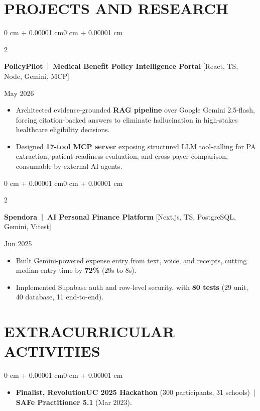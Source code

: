 \documentclass[10pt, letterpaper]{article}
\newenvironment{highlights}{
    \begin{itemize}[
        topsep=0.10 cm,
        parsep=0.06 cm,
        partopsep=0pt,
        itemsep=0.06 cm,
        leftmargin=12pt
    ]
}{
    \end{itemize}
}
\newenvironment{onecolentry}{
    \begin{adjustwidth}{0 cm + 0.00001 cm}{0 cm + 0.00001 cm}
}{
    \end{adjustwidth}
}
\newenvironment{twocolentry}[2][]{
    \onecolentry
    \def\secondColumn{#2}
    \setcolumnwidth{\fill, 4.5 cm}
    \begin{paracol}{2}
}{
    \switchcolumn \raggedleft \secondColumn
    \end{paracol}
    \endonecolentry
}
\begin{document}
\section{PROJECTS AND RESEARCH}
\begin{twocolentry}{May 2026}
\textbf{PolicyPilot \,|\, Medical Benefit Policy Intelligence Portal} [React, TS, Node, Gemini, MCP]
\end{twocolentry}
\begin{highlights}
  \item Architected evidence-grounded \textbf{RAG pipeline} over Google Gemini 2.5-flash, forcing citation-backed answers to eliminate hallucination in high-stakes healthcare eligibility decisions.
  \item Designed \textbf{17-tool MCP server} exposing structured LLM tool-calling for PA extraction, patient-readiness evaluation, and cross-payer comparison, consumable by external AI agents.
\end{highlights}

\vspace{0.12 cm}

\begin{twocolentry}{Jun 2025}
\textbf{Spendora \,|\, AI Personal Finance Platform} [Next.js, TS, PostgreSQL, Gemini, Vitest]
\end{twocolentry}
\begin{highlights}
  \item Built Gemini-powered expense entry from text, voice, and receipts, cutting median entry time by \textbf{72\%} (29s to 8s).
  \item Implemented Supabase auth and row-level security, with \textbf{80 tests} (29 unit, 40 database, 11 end-to-end).
\end{highlights}

\section{EXTRACURRICULAR ACTIVITIES}
\begin{onecolentry}
\begin{highlights}
  \item \textbf{Finalist, RevolutionUC 2025 Hackathon} (300 participants, 31 schools) \,|\, \textbf{SAFe Practitioner 5.1} (Mar 2023).
\end{highlights}
\end{onecolentry}
\end{document}
